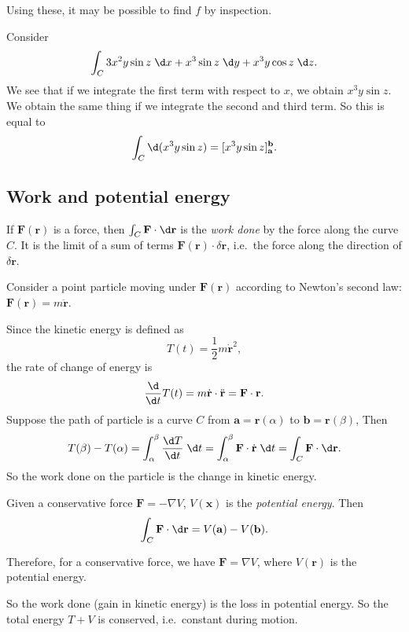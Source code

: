 \documentclass[a4paper]{article}
\begin{document}
Using these, it may be possible to find $f$ by inspection.

\begin{eg}
  Consider
  \[
    \int_C 3x^2 y\sin z\;\d x + x^3 \sin z \;\d y + x^3 y\cos z\;\d z.
  \]
  We see that if we integrate the first term with respect to $x$, we obtain $x^3 y\sin z$. We obtain the same thing if we integrate the second and third term. So this is equal to
  \[
    \int_C \d (x^3 y \sin z) = [x^3 y\sin z]^{\mathbf{b}}_{\mathbf{a}}.
  \]
\end{eg}

\subsection{Work and potential energy}
\begin{defi}
  If $\mathbf{F}(\mathbf{r})$ is a force, then $\int_C \mathbf{F}\cdot \d \mathbf{r}$ is the \emph{work done} by the force along the curve $C$. It is the limit of a sum of terms $\mathbf{F}(\mathbf{r})\cdot \delta \mathbf{r}$, i.e.\ the force along the direction of $\delta \mathbf{r}$.
\end{defi}

Consider a point particle moving under $\mathbf{F}(\mathbf{r})$ according to Newton's second law: $\mathbf{F}(\mathbf{r}) = m\ddot{\mathbf{r}}$.

Since the kinetic energy is defined as
\[
  T(t) = \frac{1}{2}m\dot{\mathbf{r}}^2,
\]
the rate of change of energy is
\[
  \frac{\d}{\d t}T(t) = m\dot{\mathbf{r}}\cdot \ddot{\mathbf{r}} = \mathbf{F}\cdot \mathbf{r}.
\]
Suppose the path of particle is a curve $C$ from $\mathbf{a} = \mathbf{r}(\alpha)$ to $\mathbf{b} = \mathbf{r}(\beta)$, Then
\[
  T(\beta) - T(\alpha) = \int_\alpha^\beta \frac{\d T}{\d t} \;\d t = \int_\alpha^\beta \mathbf{F}\cdot \dot{\mathbf{r}}\;\d t = \int_C \mathbf{F}\cdot \d \mathbf{r}.
\]
So the work done on the particle is the change in kinetic energy.

\begin{defi}
  Given a conservative force $\mathbf{F} = -\nabla V$, $V(\mathbf{x})$ is the \emph{potential energy}. Then
  \[
    \int_C \mathbf{F}\cdot \d \mathbf{r} = V(\mathbf{a}) - V(\mathbf{b}).
  \]
\end{defi}
Therefore, for a conservative force, we have $\mathbf{F} = \nabla V$, where $V(\mathbf{r})$ is the potential energy.

So the work done (gain in kinetic energy) is the loss in potential energy. So the total energy $T + V$ is conserved, i.e.\ constant during motion.
\end{document}
